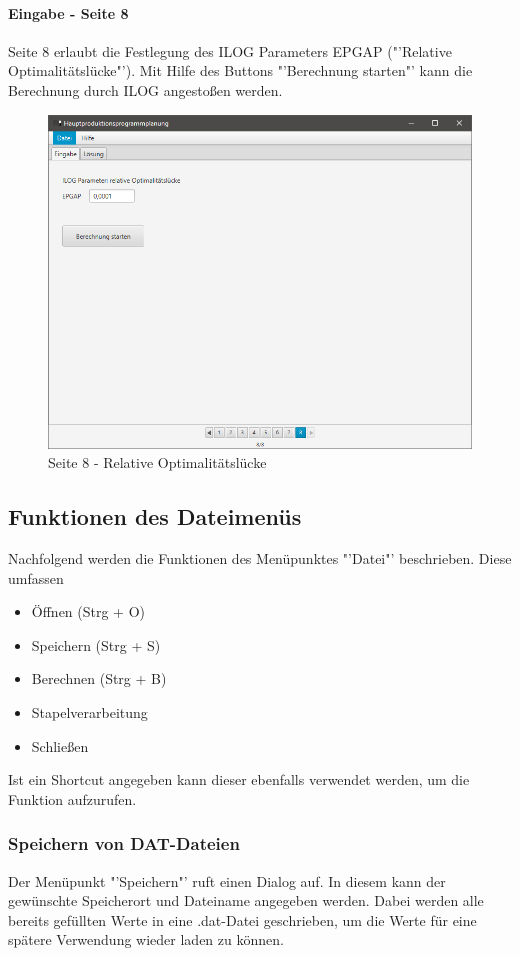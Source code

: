 \documentclass[12pt,a4paper, listof=entryprefix, bibliography=totocnumbered,toc=listofnumbered,lof=listofnumbered]{scrartcl}
\begin{document}
\pagebreak

\paragraph{Eingabe - Seite 8}
Seite 8 erlaubt die Festlegung des ILOG Parameters EPGAP ("'Relative Optimalitätslücke"'). Mit Hilfe des Buttons "'Berechnung starten"' kann die Berechnung durch ILOG angestoßen werden.

\begin{figure}[H]
	\centering
	\includegraphics[width=.8\linewidth]{images/seite8.png} 
	\caption{Seite 8 - Relative Optimalitätslücke}
	\label{fig:seite8}
\end{figure}

\subsection{Funktionen des Dateimenüs}
Nachfolgend werden die Funktionen des Menüpunktes "'Datei"' beschrieben. Diese umfassen

\begin{itemize}
	\item Öffnen (Strg + O)
	\item Speichern (Strg + S)
	\item Berechnen (Strg + B)
	\item Stapelverarbeitung
	\item Schließen
\end{itemize}

Ist ein Shortcut angegeben kann dieser ebenfalls verwendet werden, um die Funktion aufzurufen.

\subsubsection{Speichern von DAT-Dateien}
Der Menüpunkt "'Speichern"' ruft einen Dialog auf. In diesem kann der gewünschte Speicherort und Dateiname angegeben werden. Dabei werden alle bereits gefüllten Werte in eine .dat-Datei geschrieben, um die Werte für eine spätere Verwendung wieder laden zu können.
\end{document}
